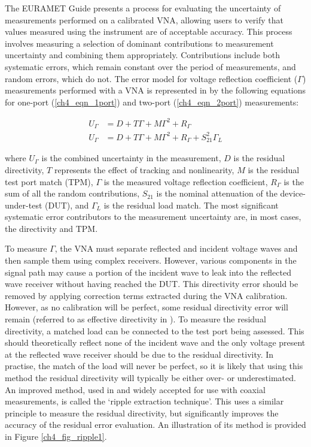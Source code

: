 \documentclass[../thesis/thesis.tex]{subfiles}
\begin{document}
\begin{refsection}
The EURAMET Guide \cite{EURAMET_2011} presents a process for evaluating the uncertainty of measurements performed on a calibrated VNA, allowing users to verify that values measured using the instrument are of acceptable accuracy. This process involves measuring a selection of dominant contributions to measurement uncertainty and combining them appropriately. Contributions include both systematic errors, which remain constant over the period of measurements, and random errors, which do not.  The error model for voltage reflection coefficient ($\Gamma$) measurements performed with a VNA is represented in \cite{EURAMET_2011} by the following equations for one-port (\ref{ch4_eqn_1port}) and two-port (\ref{ch4_eqn_2port}) measurements:

\begin{align}
U_{\Gamma} &= D + T\Gamma + M\Gamma^2 + R_{\Gamma} \label{ch4_eqn_1port} \\
U_{\Gamma} &= D + T\Gamma + M\Gamma^2 + R_{\Gamma} + S_{21}^2\Gamma_L \label{ch4_eqn_2port}
\end{align}

where $U_{\Gamma}$ is the combined uncertainty in the measurement, $D$ is the residual directivity, $T$ represents the effect of tracking and nonlinearity, $M$ is the residual test port match (TPM), $\Gamma$ is the measured voltage reflection coefficient, $R_{\Gamma}$ is the sum of all the random contributions, $S_{21}$ is the nominal attenuation of the device-under-test (DUT), and $\Gamma_L$ is the residual load match. The most significant systematic error contributors to the measurement uncertainty are, in most cases, the directivity and TPM.

To measure $\Gamma$, the VNA must separate reflected and incident voltage waves and then sample them using complex receivers. However, various components in the signal path may cause a portion of the incident wave to leak into the reflected wave receiver without having reached the DUT. This directivity error should be removed by applying correction terms extracted during the VNA calibration. However, as no calibration will be perfect, some residual directivity error will remain (referred to as effective directivity in \cite{EURAMET_2011}). To measure the residual directivity, a matched load can be connected to the test port being assessed. This should theoretically reflect none of the incident wave and the only voltage present at the reflected wave receiver should be due to the residual directivity. In practise, the match of the load will never be perfect, so it is likely that using this method the residual directivity will typically be either over- or underestimated. An improved method, used in \cite{EURAMET_2011} and widely accepted for use with coaxial measurements, is called the ‘ripple extraction technique’. This uses a similar principle to measure the residual directivity, but significantly improves the accuracy of the residual error evaluation. An illustration of its method is provided in Figure \ref{ch4_fig_ripple1}.


\end{refsection}
\end{document}
